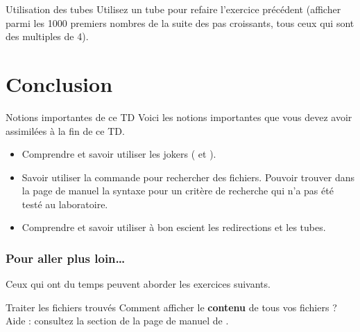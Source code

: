 \documentclass[a4paper,11pt]{style-esi/td}
\begin{document}
		\begin{Exercice}{Utilisation des tubes}
			Utilisez un tube pour refaire l'exercice précédent
			(afficher parmi les 1000 premiers nombres de la suite des pas croissants,
			tous ceux qui sont des multiples de 4).
		\end{Exercice}

\section{Conclusion}

	\begin{theorie}{Notions importantes de ce TD}
		Voici les notions importantes que vous devez avoir assimilées à la fin de ce TD.
		\begin{itemize}
		\item Comprendre et savoir utiliser les jokers (\samp{*} et ).
		\item Savoir utiliser la commande  pour rechercher des fichiers.
			Pouvoir trouver dans la page de manuel la syntaxe pour un critère de recherche
			qui n'a pas été testé au laboratoire.
		\item Comprendre et savoir utiliser à bon escient les redirections et les tubes.
		\end{itemize}
	\end{theorie}

	\subsubsection*{Pour aller plus loin\dots}
	Ceux qui ont du temps peuvent aborder les exercices suivants.

	\begin{Exercice}{Traiter les fichiers trouvés}
		Comment afficher le \textbf{contenu} de tous vos fichiers  ?
		Aide : consultez la section  de la page de manuel
		de .
	\end{Exercice}
\end{document}
